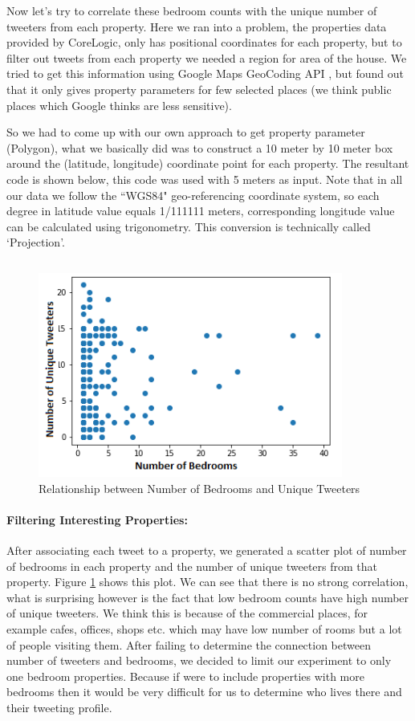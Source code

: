 \documentclass[12pt]{report}
\theoremstyle{named}
\begin{document}
Now let's try to correlate these bedroom counts with the unique number of tweeters from each property. Here we ran into a problem, the properties data provided by CoreLogic, only has positional coordinates for each property, but to filter out tweets from each property we needed a region for area of the house. We tried to get this information using Google Maps GeoCoding API \cite{GoogleGeoCodingAPI}, but found out that it only gives property parameters for few selected places (we think public places which Google thinks are less sensitive). 

So we had to come up with our own approach to get property parameter (Polygon), what we basically did was to construct a 10 meter by 10 meter box around the (latitude, longitude) coordinate point for each property. The resultant code is shown below, this code was used with 5 meters as input. Note that in all our data we follow the ``WGS84" geo-referencing coordinate system, so each degree in latitude value equals 1/111111 meters, corresponding longitude value can be calculated using trigonometry. This conversion is technically called `Projection'.

\inputminted{python}{pointToPolygon.py}



\begin{figure}[ht]
\centering
        \includegraphics[width=100mm,scale=1]{Images/BedroomVsTweeters.png}
    \caption{Relationship between Number of Bedrooms and Unique Tweeters}
    \label{fig:BedroomVSTweeters}
\end{figure}
\paragraph{Filtering Interesting Properties:\\}
After associating each tweet to a property, we generated a scatter plot of number of bedrooms in each property and the number of unique tweeters from that property. Figure \ref{fig:BedroomVSTweeters} shows this plot. We can see that there is no strong correlation, what is surprising however is the fact that low bedroom counts have high number of unique tweeters. We think this is because of the commercial places, for example cafes, offices, shops etc. which may have low number of rooms but a lot of people visiting them. 
After failing to determine the connection between number of tweeters and bedrooms, we decided to limit our experiment to only one bedroom properties. Because if were to include properties with more bedrooms then it would be very difficult for us to determine who lives there and their tweeting profile.
\end{document}
